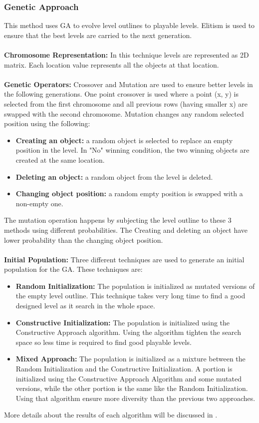 \subsubsection{Genetic Approach}
This method uses GA to evolve level outlines to playable levels. Elitism is used to ensure that the best levels are carried to the next generation.\\\\
\textbf{Chromosome Representation:} In this technique levels are represented as 2D matrix. Each location value represents all the objects at that location.\\\\
\textbf{Genetic Operators:} Crossover and Mutation are used to ensure better levels in the following generations. One point crossover is used where a point (x, y) is selected from the first chromosome and all previous rows (having smaller x) are swapped with the second chromosome. Mutation changes any random selected position using the following:
\begin{itemize} \itemsep0pt \parskip0pt 
	\item \textbf{Creating an object:} a random object is selected to replace an empty position in the level. In "No" winning condition, the two winning objects are created at the same location.
	\item \textbf{Deleting an object:} a random object from the level is deleted.
	\item \textbf{Changing object position:} a random empty position is swapped with a non-empty one.
\end{itemize}
The mutation operation happens by subjecting the level outline to these 3 methods using different probabilities. The Creating and deleting an object have lower probability than the changing object position.\\\\
\textbf{Initial Population:} Three different techniques are used to generate an initial population for the GA. These techniques are:
\begin{itemize} \itemsep0pt \parskip0pt 
	\item \textbf{Random Initialization:} The population is initialized as mutated versions of the empty level outline. This technique takes very long time to find a good designed level as it search in the whole space.
	\item \textbf{Constructive Initialization:} The population is initialized using the Constructive Approach algorithm. Using the algorithm tighten the search space so less time is required to find good playable levels.
	\item \textbf{Mixed Approach:} The population is initialized as a mixture between the Random Initialization and the Constructive Initialization. A portion is initialized using the Constructive Approach Algorithm and some mutated versions, while the other portion is the same like the Random Initialization. Using that algorithm ensure more diversity than the previous two approaches.
\end{itemize}
More details about the results of each algorithm will be discussed in .

